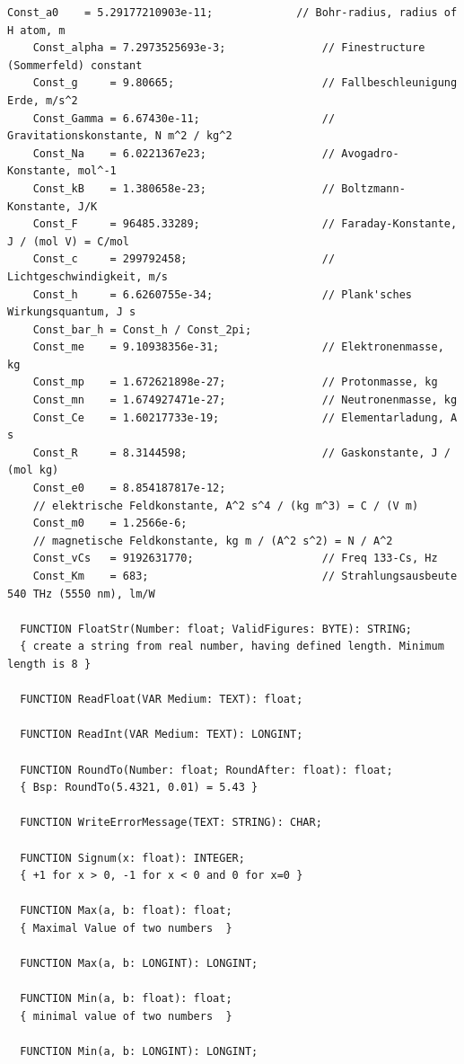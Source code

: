 \begin{refsection}
\begin{lstlisting}[caption=Interface of unit MathFunc]
    Const_a0    = 5.29177210903e-11;             // Bohr-radius, radius of H atom, m
    Const_alpha = 7.2973525693e-3;               // Finestructure (Sommerfeld) constant
    Const_g     = 9.80665;                       // Fallbeschleunigung Erde, m/s^2
    Const_Gamma = 6.67430e-11;                   // Gravitationskonstante, N m^2 / kg^2
    Const_Na    = 6.0221367e23;                  // Avogadro-Konstante, mol^-1
    Const_kB    = 1.380658e-23;                  // Boltzmann-Konstante, J/K
    Const_F     = 96485.33289;                   // Faraday-Konstante, J / (mol V) = C/mol
    Const_c     = 299792458;                     // Lichtgeschwindigkeit, m/s
    Const_h     = 6.6260755e-34;                 // Plank'sches Wirkungsquantum, J s
    Const_bar_h = Const_h / Const_2pi;
    Const_me    = 9.10938356e-31;                // Elektronenmasse, kg
    Const_mp    = 1.672621898e-27;               // Protonmasse, kg
    Const_mn    = 1.674927471e-27;               // Neutronenmasse, kg
    Const_Ce    = 1.60217733e-19;                // Elementarladung, A s
    Const_R     = 8.3144598;                     // Gaskonstante, J / (mol kg)
    Const_e0    = 8.854187817e-12;
    // elektrische Feldkonstante, A^2 s^4 / (kg m^3) = C / (V m)
    Const_m0    = 1.2566e-6;
    // magnetische Feldkonstante, kg m / (A^2 s^2) = N / A^2
    Const_vCs   = 9192631770;                    // Freq 133-Cs, Hz
    Const_Km    = 683;                           // Strahlungsausbeute 540 THz (5550 nm), lm/W

  FUNCTION FloatStr(Number: float; ValidFigures: BYTE): STRING;
  { create a string from real number, having defined length. Minimum length is 8 }

  FUNCTION ReadFloat(VAR Medium: TEXT): float;

  FUNCTION ReadInt(VAR Medium: TEXT): LONGINT;

  FUNCTION RoundTo(Number: float; RoundAfter: float): float;
  { Bsp: RoundTo(5.4321, 0.01) = 5.43 }

  FUNCTION WriteErrorMessage(TEXT: STRING): CHAR;

  FUNCTION Signum(x: float): INTEGER;
  { +1 for x > 0, -1 for x < 0 and 0 for x=0 }

  FUNCTION Max(a, b: float): float;
  { Maximal Value of two numbers  }

  FUNCTION Max(a, b: LONGINT): LONGINT;

  FUNCTION Min(a, b: float): float;
  { minimal value of two numbers  }

  FUNCTION Min(a, b: LONGINT): LONGINT;


\end{lstlisting}
\end{refsection}
